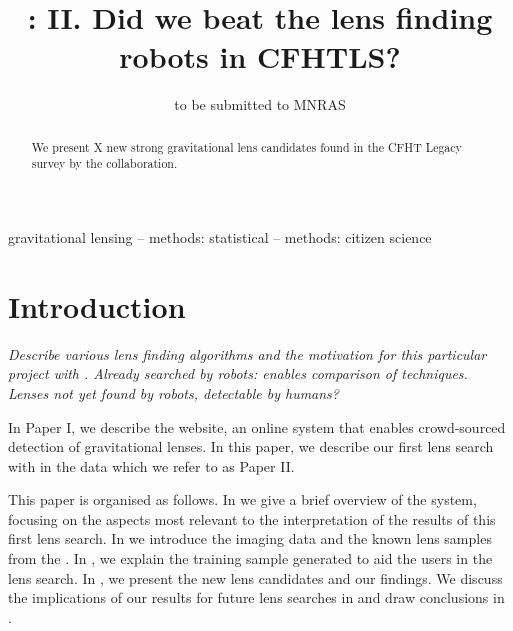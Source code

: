 \documentclass[useAMS,usenatbib,a4paper]{mn2e}
\title[\sw II]
{\SW: II. Did we beat the lens finding robots in CFHTLS?}
\author[More et al.]{%
 
}
\begin{document}
             
\date{to be submitted to MNRAS}
\pagerange{\pageref{firstpage}--\pageref{lastpage}}

\maketitle           

\label{firstpage}


\begin{abstract} 
We present X new strong gravitational lens candidates found in the CFHT
Legacy
survey by the \sw collaboration.

\end{abstract}


\begin{keywords}
  gravitational lensing   --
  methods: statistical    --
  methods: citizen science
\end{keywords}

\setcounter{footnote}{1}


\section{Introduction}
\label{sec:intro}

{\it Describe various lens finding algorithms and the motivation for this
particular project with \cfhtls. Already searched by robots: enables comparison of techniques. Lenses not
yet found by robots, detectable by humans? }

In Paper I, we describe the \sw website, an online system that enables
crowd-sourced detection of gravitational lenses. In this paper, we
describe our first lens search with \sw in the \cfhtls data which we
refer to as Paper II.  

This paper is organised as follows. In  we give a brief
overview of the \sw system, focusing on the aspects most relevant to the
interpretation of the results of this first lens search. In
 we introduce the \cfhtls imaging data and the known lens
samples from the \cfhtls. In , we explain the training sample
generated to aid the \sw users in the lens search. In
, we present the new lens candidates and our findings.
We discuss the implications of our results for future lens searches in
 and draw conclusions in .
\end{document}
